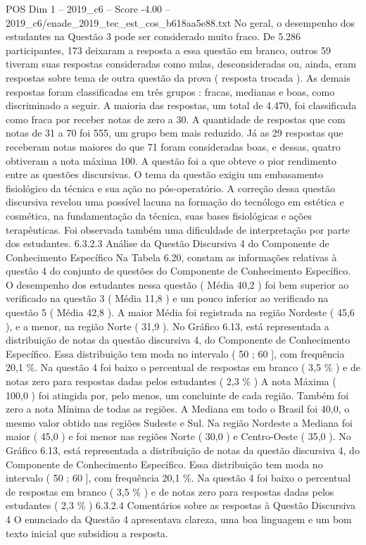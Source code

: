 \begin{textsample}{POS Dim 1 – 2019\_c6 – Score -4.00 – 2019\_c6/enade\_2019\_tec\_est\_cos\_b618aa5e88.txt}
No geral, o desempenho dos estudantes na Questão 3 pode ser considerado muito fraco.
De 5.286 participantes, 173 deixaram a resposta a essa questão em branco, outros 59 tiveram suas respostas consideradas como nulas, desconsideradas ou, ainda, eram respostas sobre tema de outra questão da prova ( resposta trocada ).
As demais respostas foram classificadas em três grupos : fracas, medianas e boas, como discriminado a seguir.
A maioria das respostas, um total de 4.470, foi classificada como fraca por receber notas de zero a 30.
A quantidade de respostas que com notas de 31 a 70 foi 555, um grupo bem mais reduzido.
Já as 29 respostas que receberam notas maiores do que 71 foram consideradas boas, e dessas, quatro obtiveram a nota máxima 100.
A questão foi a que obteve o pior rendimento entre as questões discursivas.
O tema da questão exigiu um embasamento fisiológico da técnica e sua ação no pós-operatório.
A correção dessa questão discursiva revelou uma possível lacuna na formação do tecnólogo em estética e cosmética, na fundamentação da técnica, suas bases fisiológicas e ações terapêuticas.
Foi observada também uma dificuldade de interpretação por parte dos estudantes. 6.3.2.3 Análise da Questão Discursiva 4 do Componente de Conhecimento Específico Na Tabela 6.20, constam as informações relativas à questão 4 do conjunto de questões do Componente de Conhecimento Específico.
O desempenho dos estudantes nessa questão ( Média 40,2 ) foi bem superior ao verificado na questão 3 ( Média 11,8 ) e um pouco inferior ao verificado na questão 5 ( Média 42,8 ).
A maior Média foi registrada na região Nordeste ( 45,6 ), e a menor, na região Norte ( 31,9 ).
No Gráfico 6.13, está representada a distribuição de notas da questão discursiva 4, do Componente de Conhecimento Específico.
Essa distribuição tem moda no intervalo ( 50 ; 60 ], com frequência 20,1 \%.
Na questão 4 foi baixo o percentual de respostas em branco ( 3,5 \% ) e de notas zero para respostas dadas pelos estudantes ( 2,3 \% ) A nota Máxima ( 100,0 ) foi atingida por, pelo menos, um concluinte de cada região.
Também foi zero a nota Mínima de todas as regiões.
A Mediana em todo o Brasil foi 40,0, o mesmo valor obtido nas regiões Sudeste e Sul.
Na região Nordeste a Mediana foi maior ( 45,0 ) e foi menor nas regiões Norte ( 30,0 ) e Centro-Oeste ( 35,0 ).
No Gráfico 6.13, está representada a distribuição de notas da questão discursiva 4, do Componente de Conhecimento Específico.
Essa distribuição tem moda no intervalo ( 50 ; 60 ], com frequência 20,1 \%.
Na questão 4 foi baixo o percentual de respostas em branco ( 3,5 \% ) e de notas zero para respostas dadas pelos estudantes ( 2,3 \% ) 6.3.2.4 Comentários sobre as respostas à Questão Discursiva 4 O enunciado da Questão 4 apresentava clareza, uma boa linguagem e um bom texto inicial que subsidiou a resposta.

\end{textsample}
